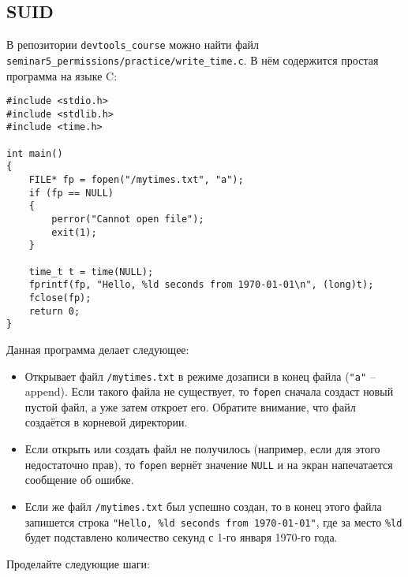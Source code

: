 \documentclass{article}
\begin{document}
\subsection{SUID}
В репозитории \texttt{devtools\_course} можно найти файл \texttt{seminar5\_permissions/practice/write\_time.c}. В нём содержится простая программа на языке C:
\begin{lstlisting}[style=csMiptCStyle]
#include <stdio.h>
#include <stdlib.h>
#include <time.h>

int main()
{
    FILE* fp = fopen("/mytimes.txt", "a");
    if (fp == NULL)
    {
        perror("Cannot open file");
        exit(1);
    }

    time_t t = time(NULL);
    fprintf(fp, "Hello, %ld seconds from 1970-01-01\n", (long)t);
    fclose(fp);
    return 0;
}
\end{lstlisting}
Данная программа делает следующее:
\begin{itemize}
\item Открывает файл \texttt{/mytimes.txt} в режиме дозаписи в конец файла (\texttt{"a"} -- append). Если такого файла не существует, то \texttt{fopen} сначала создаст новый пустой файл, а уже затем откроет его. Обратите внимание, что файл создаётся в корневой директории.
\item Если открыть или создать файл не получилось (например, если для этого недостаточно прав), то \texttt{fopen} вернёт значение \texttt{NULL} и на экран напечатается сообщение об ошибке.
\item Если же файл \texttt{/mytimes.txt} был успешно создан, то в конец этого файла запишется строка \texttt{"Hello, \%ld seconds from 1970-01-01"}, где за место \texttt{\%ld} будет подставлено количество секунд с 1-го января 1970-го года.
\end{itemize}
Проделайте следующие шаги:
\end{document}
